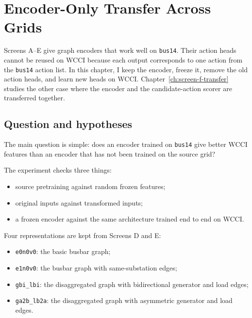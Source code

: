 \chapter{Encoder-Only Transfer Across Grids}
\label{ch:encoder-transfer-bridge}

\begingroup
\color{red}

\newcommand{\plainpending}[1]{[Pending: #1]}
\newcommand{\plainpendingplot}[2][0.20\textheight]{%
  \setlength{\fboxrule}{0.7pt}%
  \fbox{\begin{minipage}[c][#1][c]{0.90\linewidth}%
    \centering\small #2%
  \end{minipage}}%
}

Screens A--E give graph encoders that work well on \texttt{bus14}. Their
action heads cannot be reused on WCCI because each output corresponds to one
action from the \texttt{bus14} action list. In this chapter, I keep the
encoder, freeze it, remove the old action heads, and learn new heads on WCCI.
Chapter~\ref{ch:screen-f-transfer} studies the other case where the encoder and
the candidate-action scorer are transferred together.

\section{Question and hypotheses}
\label{sec:encoder-transfer-question}

The main question is simple: does an encoder trained on \texttt{bus14} give
better WCCI features than an encoder that has not been trained on the source
grid?

The experiment checks three things:

\begin{itemize}
  \item source pretraining against random frozen features;
  \item original inputs against transformed inputs;
  \item a frozen encoder against the same architecture trained end to end on
  WCCI.
\end{itemize}

Four representations are kept from Screens D and E:

\begin{itemize}
  \item \texttt{e0n0v0}: the basic busbar graph;
  \item \texttt{e1n0v0}: the busbar graph with same-substation edges;
  \item \texttt{gbi\_lbi}: the disaggregated graph with bidirectional generator
  and load edges;
  \item \texttt{ga2b\_lb2a}: the disaggregated graph with asymmetric generator
  and load edges.
\end{itemize}

